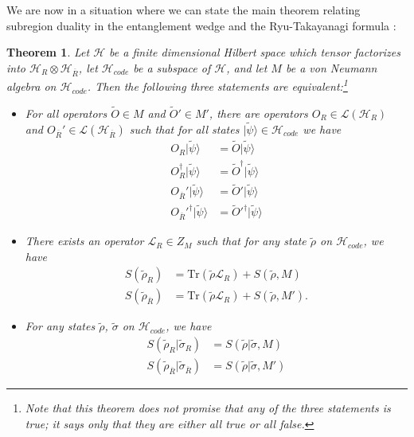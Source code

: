 \documentclass[toc]{PoS}
\newcommand{\bi}{\begin{itemize}}
\newcommand{\ei}{\end{itemize}}
\newcommand{\ran}{\rangle}
\newcommand{\Tr}{\mathrm{Tr}}
\newcommand{\wt}{\widetilde}
\newcommand{\Ll}{\mathcal{L}}
\newcommand{\LR}{\mathcal{L}_R}
\newcommand{\Hh}{\mathcal{H}}
\newcommand{\Hc}{\mathcal{H}_{code}}
\newcommand{\ol}{\overline}
\newtheorem{thm}{Theorem}[section]
\begin{document}
We are now in a situation where we can state the main theorem relating subregion duality in the entanglement wedge and the Ryu-Takayanagi formula \cite{Harlow:2016vwg}:
\begin{thm}\label{bigthm}
Let $\Hh$ be a finite dimensional Hilbert space which tensor factorizes into $\Hh_R\otimes \Hh_{\ol{R}}$, let $\Hc$ be a subspace of $\Hh$, and let $M$ be a von Neumann algebra on $\Hc$.  Then the following three statements are equivalent:\footnote{Note that this theorem does not promise that any of the three statements is true; it says only that they are either all true or all false.}
\bi
\item[(1)] For all operators $\wt{O}\in M$ and $\wt{O}'\in M'$, there are operators $O_R\in \Ll(\Hh_R)$ and $O_{\ol{R}}'\in \Ll(\Hh_{\ol{R}})$ such that for all states $|\wt{\psi}\ran\in \Hc$ we have
\begin{align}\nonumber
O_R|\wt{\psi}\ran&=\wt{O}|\wt{\psi}\ran\\\nonumber
O_R^\dagger|\wt{\psi}\ran&=\wt{O}^\dagger|\wt{\psi}\ran\\\nonumber
O_{\ol{R}}'|\wt{\psi}\ran&=\wt{O}'|\wt{\psi}\ran\\
O_{\ol{R}}'^\dagger|\wt{\psi}\ran&=\wt{O}'^\dagger|\wt{\psi}\ran
\end{align}
\item[(2)] There exists an operator $\LR\in Z_M$ such that for any state $\wt{\rho}$ on $\Hc$, we have
\begin{align}\nonumber
S(\wt{\rho}_R)&=\Tr\left(\wt{\rho}\LR\right)+S(\wt{\rho},M)\\
S(\wt{\rho}_{\ol{R}})&=\Tr\left(\wt{\rho}\LR\right)+S(\wt{\rho},M').\label{codeRT}
\end{align}
\item[(3)] For any states $\wt{\rho}$, $\wt{\sigma}$ on $\Hc$, we have
\begin{align}\nonumber
S(\wt{\rho}_R|\wt{\sigma}_R)&=S(\wt{\rho}|\wt{\sigma},M)\\
S(\wt{\rho}_{\ol{R}}|\wt{\sigma}_{\ol{R}})&=S(\wt{\rho}|\wt{\sigma},M')
\end{align}
\ei
\end{thm}
\end{document}
